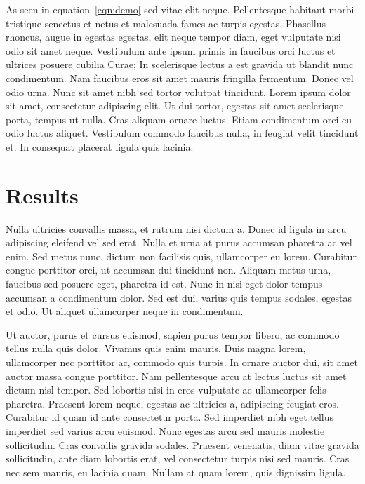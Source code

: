 As seen in equation~\ref{eqn:demo} sed vitae elit neque. Pellentesque habitant morbi tristique senectus et netus et malesuada fames ac turpis egestas. Phasellus rhoncus, augue in egestas egestas, elit neque tempor diam, eget vulputate nisi odio sit amet neque. Vestibulum ante ipsum primis in faucibus orci luctus et ultrices posuere cubilia Curae; In scelerisque lectus a est gravida ut blandit nunc condimentum. Nam faucibus eros sit amet mauris fringilla fermentum. Donec vel odio urna. Nunc sit amet nibh sed tortor volutpat tincidunt. Lorem ipsum dolor sit amet, consectetur adipiscing elit. Ut dui tortor, egestas sit amet scelerisque porta, tempus ut nulla. Cras aliquam ornare luctus. Etiam condimentum orci eu odio luctus aliquet. Vestibulum commodo faucibus nulla, in feugiat velit tincidunt et. In consequat placerat ligula quis lacinia.

\section{Results}

Nulla ultricies convallis massa, et rutrum nisi dictum a. Donec id ligula in arcu adipiscing eleifend vel sed erat. Nulla et urna at purus accumsan pharetra ac vel enim. Sed metus nunc, dictum non facilisis quis, ullamcorper eu lorem. Curabitur congue porttitor orci, ut accumsan dui tincidunt non. Aliquam metus urna, faucibus sed posuere eget, pharetra id est. Nunc in nisi eget dolor tempus accumsan a condimentum dolor. Sed est dui, varius quis tempus sodales, egestas et odio. Ut aliquet ullamcorper neque in condimentum.

Ut auctor, purus et cursus euismod, sapien purus tempor libero, ac commodo tellus nulla quis dolor. Vivamus quis enim mauris. Duis magna lorem, ullamcorper nec porttitor ac, commodo quis turpis. In ornare auctor dui, sit amet auctor massa congue porttitor. Nam pellentesque arcu at lectus luctus sit amet dictum nisl tempor. Sed lobortis nisi in eros vulputate ac ullamcorper felis pharetra. Praesent lorem neque, egestas ac ultricies a, adipiscing feugiat eros. Curabitur id quam id ante consectetur porta. Sed imperdiet nibh eget tellus imperdiet sed varius arcu euismod. Nunc egestas arcu sed mauris molestie sollicitudin. Cras convallis gravida sodales. Praesent venenatis, diam vitae gravida sollicitudin, ante diam lobortis erat, vel consectetur turpis nisi sed mauris. Cras nec sem mauris, eu lacinia quam. Nullam at quam lorem, quis dignissim ligula.



